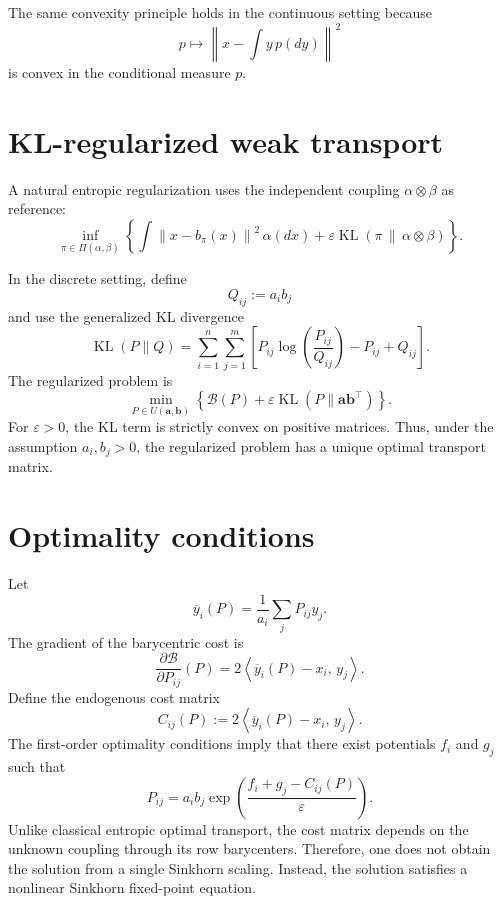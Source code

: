 \documentclass[11pt]{article}
\newcommand{\PiSet}{\Pi}
\newcommand{\KL}{\operatorname{KL}}
\begin{document}
The same convexity principle holds in the continuous setting because
\[
    p\longmapsto
    \left\|x-\int y\,p(dy)\right\|^2
\]
is convex in the conditional measure $p$.

\section{KL-regularized weak transport}

A natural entropic regularization uses the independent coupling
$\alpha\otimes\beta$ as reference:
\[
    \boxed{
    \inf_{\pi\in\PiSet(\alpha,\beta)}
    \left\{
        \int
        \left\|x-b_\pi(x)\right\|^2\,\alpha(dx)
        +
        \varepsilon
        \KL\!\left(\pi\,\middle\|\,\alpha\otimes\beta\right)
    \right\}.
    }
\]

In the discrete setting, define
\[
    Q_{ij}:=a_i b_j
\]
and use the generalized KL divergence
\[
    \KL(P\|Q)
    =
    \sum_{i=1}^n\sum_{j=1}^m
    \left[
        P_{ij}\log\left(\frac{P_{ij}}{Q_{ij}}\right)
        -P_{ij}+Q_{ij}
    \right].
\]
The regularized problem is
\[
    \boxed{
    \min_{P\in U(\bm{a},\bm{b})}
    \left\{
        \mathcal{B}(P)
        +
        \varepsilon\KL(P\|\bm{a}\bm{b}^{\top})
    \right\}.
    }
\]
For $\varepsilon>0$, the KL term is strictly convex on positive matrices.
Thus, under the assumption $a_i,b_j>0$, the regularized problem has a unique
optimal transport matrix.

\section{Optimality conditions}

Let
\[
    \overline{y}_i(P)
    =
    \frac{1}{a_i}\sum_j P_{ij}y_j.
\]
The gradient of the barycentric cost is
\[
    \frac{\partial\mathcal{B}}{\partial P_{ij}}(P)
    =
    2\left\langle
        \overline{y}_i(P)-x_i,\,
        y_j
    \right\rangle.
\]
Define the endogenous cost matrix
\[
    C_{ij}(P)
    :=
    2\left\langle
        \overline{y}_i(P)-x_i,\,
        y_j
    \right\rangle.
\]
The first-order optimality conditions imply that there exist potentials
$f_i$ and $g_j$ such that
\[
    P_{ij}
    =
    a_i b_j
    \exp\left(
        \frac{
            f_i+g_j-C_{ij}(P)
        }{\varepsilon}
    \right).
\]
Unlike classical entropic optimal transport, the cost matrix depends on the
unknown coupling through its row barycenters. Therefore, one does not obtain
the solution from a single Sinkhorn scaling. Instead, the solution satisfies
a nonlinear Sinkhorn fixed-point equation.
\end{document}
